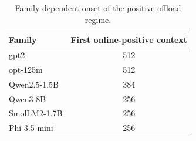 \begin{table}[t]
\centering
\caption{Family-dependent onset of the positive offload regime.}
\label{tab:family-onset}
\begin{tabular}{lc}
\toprule
Family & First online-positive context \\
\midrule
gpt2 & 512 \\
opt-125m & 512 \\
Qwen2.5-1.5B & 384 \\
Qwen3-8B & 256 \\
SmolLM2-1.7B & 256 \\
Phi-3.5-mini & 256 \\
\bottomrule
\end{tabular}
\end{table}
